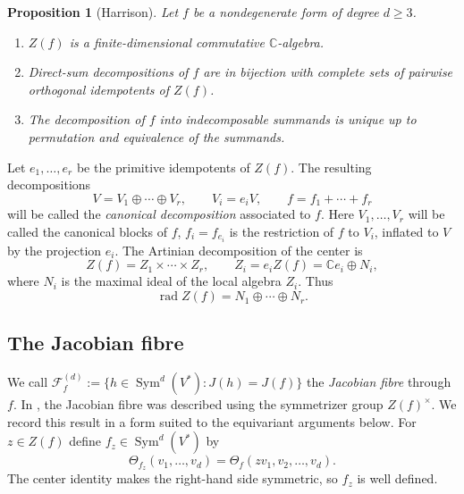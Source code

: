 \documentclass[11pt,reqno]{amsart}
\numberwithin{equation}{section}
\newtheorem{proposition}[theorem]{Proposition}
\theoremstyle{definition}
\theoremstyle{remark}
\newcommand{\C}{\mathbb C}
\newcommand{\Sym}{\operatorname{Sym}}
\newcommand{\rad}{\operatorname{rad}}
\newcommand{\cF}{\mathcal F}
\begin{document}
\begin{proposition}[Harrison]\label{prop:HLYZ-center}
Let $f$ be a nondegenerate form of degree $d\geq3$.
\begin{enumerate}[label=\textup{(\roman*)},leftmargin=0.9cm]
\item $Z(f)$ is a finite-dimensional commutative $\C$-algebra.
\item Direct-sum decompositions of $f$ are in bijection with complete
sets of pairwise orthogonal idempotents of $Z(f)$.
\item The decomposition of $f$ into indecomposable summands is unique
up to permutation and equivalence of the summands.
\end{enumerate}
\end{proposition}



Let $e_1,\ldots,e_r$ be the primitive idempotents of $Z(f)$.  The
resulting decompositions
\begin{equation}\label{eq:canonical-decomposition}
  V=V_1\oplus\cdots\oplus V_r,
  \qquad V_i=e_iV,
  \qquad f=f_1+\cdots + f_r
\end{equation}
will be  called the \emph{canonical decomposition} associated to  $f$.  Here $V_1,\dots,V_r$ will be called the canonical blocks of $f$, 
$f_i=f_{e_i}$ is the restriction of $f$ to $V_i$, inflated to $V$ by
the projection $e_i$.  The Artinian decomposition of the center is
\begin{equation}\label{eq:local-center}
  Z(f)=Z_1\times\cdots\times Z_r,
  \qquad Z_i=e_iZ(f)=\C e_i\oplus N_i,
\end{equation}
where $N_i$ is the maximal ideal of the local algebra $Z_i$.  Thus
\[
  \rad Z(f)=N_1\oplus\cdots\oplus N_r.
\]

\subsection{The Jacobian fibre}

We call $\cF_f^{(d)}:=\{h\in\Sym^d(V^*):J(h)=J(f)\}$ the \emph{Jacobian fibre} through $f$.  In \cite{Hwang},   the Jacobian fibre was described using the symmetrizer group $Z(f)^{\times}$. We record this result  in a form suited to the equivariant arguments below. For $z\in Z(f)$ define $f_z\in\Sym^d(V^*)$ by
\begin{equation}\label{eq:fz}
  \Theta_{f_z}(v_1,\ldots,v_d)
  =
  \Theta_f(zv_1,v_2,\ldots,v_d).
\end{equation}
The center identity makes the right-hand side symmetric, so $f_z$ is
well defined.
\end{document}
